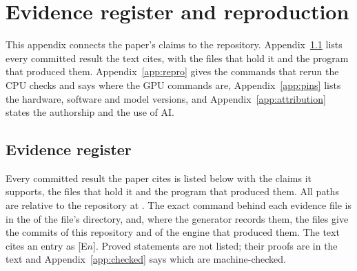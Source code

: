 \section{Evidence register and reproduction}\label{app:record}
This appendix connects the paper's claims to the repository. Appendix~\ref{app:register} lists every committed result the text cites, with the files that hold it and the program that produced them. Appendix~\ref{app:repro} gives the commands that rerun the CPU checks and says where the GPU commands are, Appendix~\ref{app:pins} lists the hardware, software and model versions, and Appendix~\ref{app:attribution} states the authorship and the use of AI.

\subsection{Evidence register}\label{app:register}
Every committed result the paper cites is listed below with the claims it supports, the files that hold it and the program that produced them. All paths are relative to the repository at \repourl. The exact command behind each evidence file is in the  of the file's directory, and, where the generator records them, the files give the commits of this repository and of the engine that produced them. The text cites an entry as [E$n$]. Proved statements are not listed; their proofs are in the text and Appendix~\ref{app:checked} says which are machine-checked.

